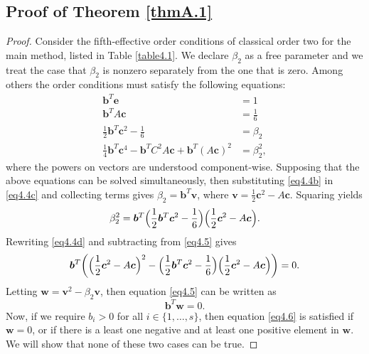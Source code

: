 \subsection{Proof of Theorem \ref{thmA.1}}
\begin{proof}
    Consider the fifth-effective order conditions of classical order two for the main method, listed in Table \ref{table4.1}. We declare \( \beta_{2} \) as a free parameter and we treat the case that \( \beta_{2} \) is nonzero separately from the one that is zero. Among others the order conditions must satisfy the following equations:
    \begin{subequations}\label{eq4.4}
        \begin{align}
            \bm{b}^{T}\bm{e} &= 1 \label{eq4.4a} \\
            \bm{b}^{T}A\bm{c} &= \frac{1}{6} \label{eq4.4b} \\
            \frac{1}{2}\bm{b}^{T}\bm{c}^{2} - \frac{1}{6} &= \beta_{2} \label{eq4.4c} \\
            \frac{1}{4}\bm{b}^{T}\bm{c}^{4} - \bm{b}^{T}C^{2}A\bm{c} + \bm{b}^{T}(A\bm{c})^{2} &= \beta_{2}^{2}, \label{eq4.4d}
        \end{align}
    \end{subequations}
    where the powers on vectors are understood component-wise. Supposing that the above equations can be solved simultaneously, then substituting \eqref{eq4.4b} in \eqref{eq4.4c} and collecting terms gives \( \beta_{2} = \bm{b}^{T}\bm{v} \), where \( \bm{v} = \frac{1}{2}\bm{c}^{2} - A\bm{c} \). Squaring yields
    \begin{equation}\label{eq4.5}
        \beta_{2}^{2} = \bm{b}^{T}\Bigl(\frac{1}{2}\bm{b}^{T}\bm{c}^{2} - \frac{1}{6}\Bigr)\Bigl(\frac{1}{2}\bm{c}^{2} - A\bm{c}\Bigr).
    \end{equation}
    Rewriting \eqref{eq4.4d} and subtracting from \eqref{eq4.5} gives
    \begin{equation}\label{eq4.6}
        \bm{b}^{T}\biggl(\Bigl(\frac{1}{2}\bm{c}^{2} - A\bm{c}\Bigr)^{2} - \Bigl(\frac{1}{2}\bm{b}^{T}\bm{c}^{2} - \frac{1}{6}\Bigr)\Bigl(\frac{1}{2}\bm{c}^{2} - A\bm{c}\Bigr)\biggr) = 0.
    \end{equation}
    Letting \( \bm{w} = \bm{v}^{2} - \beta_{2}\bm{v} \), then equation \eqref{eq4.5} can be written as
    \begin{equation}\label{eq4.6}
        \bm{b}^{T}\bm{w} = 0.
    \end{equation}
    Now, if we require \( b_{i} > 0 \) for all \( i \in \{1,\dots, s\} \), then equation \eqref{eq4.6} is satisfied if \( \bm{w} = 0 \), or if there is a least one negative and at least one positive element in \( \bm{w} \). We will show that none of these two cases can be true.
    \newline


\end{proof}
